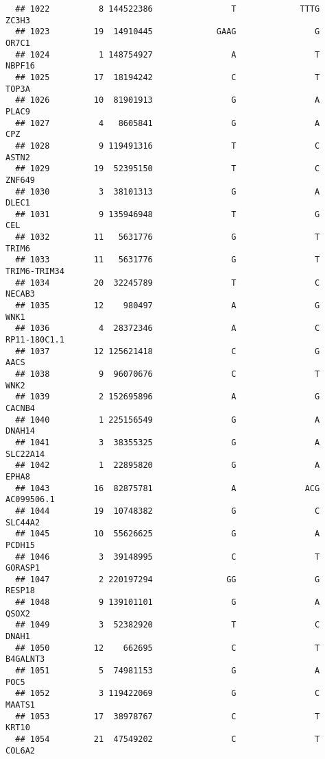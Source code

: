 \documentclass[12pt,twoside]{reedthesis}
\theoremstyle{definition}
\theoremstyle{definition}
\theoremstyle{remark}
\begin{document}
\begin{verbatim}
  ## 1022          8 144522386                T             TTTG          ZC3H3
  ## 1023         19  14910445             GAAG                G          OR7C1
  ## 1024          1 148754927                A                T         NBPF16
  ## 1025         17  18194242                C                T          TOP3A
  ## 1026         10  81901913                G                A          PLAC9
  ## 1027          4   8605841                G                A            CPZ
  ## 1028          9 119491316                T                C          ASTN2
  ## 1029         19  52395150                T                C         ZNF649
  ## 1030          3  38101313                G                A          DLEC1
  ## 1031          9 135946948                T                G            CEL
  ## 1032         11   5631776                G                T          TRIM6
  ## 1033         11   5631776                G                T   TRIM6-TRIM34
  ## 1034         20  32245789                T                C         NECAB3
  ## 1035         12    980497                A                G           WNK1
  ## 1036          4  28372346                A                C   RP11-180C1.1
  ## 1037         12 125621418                C                G           AACS
  ## 1038          9  96070676                C                T           WNK2
  ## 1039          2 152695896                A                G         CACNB4
  ## 1040          1 225156549                G                A         DNAH14
  ## 1041          3  38355325                G                A       SLC22A14
  ## 1042          1  22895820                G                A          EPHA8
  ## 1043         16  82875781                A              ACG     AC099506.1
  ## 1044         19  10748382                G                C        SLC44A2
  ## 1045         10  55626625                G                A         PCDH15
  ## 1046          3  39148995                C                T        GORASP1
  ## 1047          2 220197294               GG                G         RESP18
  ## 1048          9 139101101                G                A          QSOX2
  ## 1049          3  52382920                T                C          DNAH1
  ## 1050         12    662695                C                T       B4GALNT3
  ## 1051          5  74981153                G                A           POC5
  ## 1052          3 119422069                G                C         MAATS1
  ## 1053         17  38978767                C                T          KRT10
  ## 1054         21  47549202                C                T         COL6A2

\end{verbatim}
\end{document}

